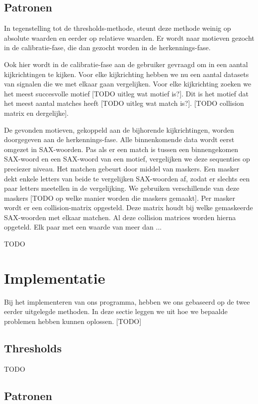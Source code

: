 \documentclass{article}
\begin{document}
\subsection{Patronen}

In tegenstelling tot de thresholds-methode, steunt deze methode weinig op absolute waarden en eerder op relatieve waarden. Er wordt naar motieven gezocht in de calibratie-fase, die dan gezocht worden in de herkennings-fase. \cite{motifs}

Ook hier wordt in de calibratie-fase aan de gebruiker gevraagd om in een aantal kijkrichtingen te kijken. Voor elke kijkrichting hebben we nu een aantal datasets van signalen die we met elkaar gaan vergelijken. Voor elke kijkrichting zoeken we het meest succesvolle motief [TODO uitleg wat motief is?]. Dit is het motief dat het meest aantal matches heeft [TODO uitleg wat match is?]. [TODO collision matrix en dergelijke].

De gevonden motieven, gekoppeld aan de bijhorende kijkrichtingen, worden doorgegeven aan de herkennings-fase. Alle binnenkomende data wordt eerst omgezet in SAX-woorden. Pas als er een match is tussen een binnengekomen SAX-woord en een SAX-woord van een motief, vergelijken we deze sequenties op preciezer niveau. Het matchen gebeurt door middel van maskers. Een masker dekt enkele letters van beide te vergelijken SAX-woorden af, zodat er slechts een paar letters meetellen in de vergelijking. We gebruiken verschillende van deze maskers [TODO op welke manier worden die maskers gemaakt]. Per masker wordt er een collision-matrix opgesteld. Deze matrix houdt bij welke gemaskeerde SAX-woorden met elkaar matchen. Al deze collision matrices worden hierna opgeteld. Elk paar met een waarde van meer dan ...

TODO

\section{Implementatie}

Bij het implementeren van ons programma, hebben we ons gebaseerd op de twee eerder uitgelegde methoden. In deze sectie leggen we uit hoe we bepaalde problemen hebben kunnen oplossen. [TODO]

\subsection{Thresholds}

TODO

\subsection{Patronen}
\end{document}
